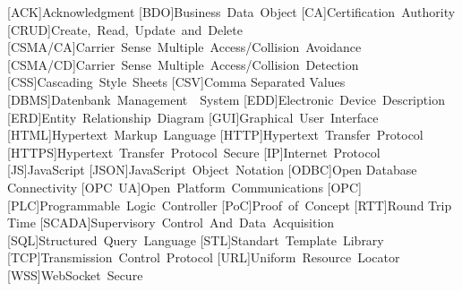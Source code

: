   \begin{acronym}
    [ACK]{Acknowledgment}
    [BDO]{Business Data Object}
    [CA]{Certification Authority}
    [CRUD]{Create, Read, Update and Delete}
    [CSMA/CA]{Carrier Sense Multiple Access/Collision Avoidance}
    [CSMA/CD]{Carrier Sense Multiple Access/Collision Detection}
    [CSS]{Cascading Style Sheets}
    [CSV]{Comma Separated Values}
    [DBMS]{Datenbank Management  System}
    [EDD]{Electronic Device Description}
    [ERD]{Entity Relationship Diagram}
    [GUI]{Graphical User Interface}
    [HTML]{Hypertext Markup Language}
    [HTTP]{Hypertext Transfer Protocol}
    [HTTPS]{Hypertext Transfer Protocol Secure}
    [IP]{Internet Protocol}
    [JS]{JavaScript}
    [JSON]{JavaScript Object Notation}
    [ODBC]{Open Database Connectivity}
    [OPC UA]{Open Platform Communications}
    [OPC]{}
    [PLC]{Programmable Logic Controller}
    [PoC]{Proof of Concept}
    [RTT]{Round Trip Time}
    [SCADA]{Supervisory Control And Data Acquisition}
    [SQL]{Structured Query Language}
    [STL]{Standart Template Library}
    [TCP]{Transmission Control Protocol}
    [URL]{Uniform Resource Locator}
    [WSS]{WebSocket Secure}
  \end{acronym}
